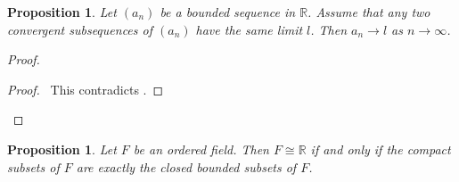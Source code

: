 \documentclass{article}
\let\qed\relax
\newtheorem{proposition}[axiom]{Proposition}
\theoremstyle{definition}
\begin{document}
\begin{proposition}
    Let $(a_n)$ be a bounded sequence in $\mathbb{R}$. Assume that any two convergent subsequences of $(a_n)$ have the same limit $l$.
    Then $a_n \rightarrow l$ as $n \rightarrow \infty$.
\end{proposition}

\begin{proof}
    \pf
    \qedstep
    \begin{proof}
        \pf\ This contradicts .
    \end{proof}
    \qed
\end{proof}

\begin{proposition}
    Let $F$ be an ordered field. Then $F \cong \mathbb{R}$ if and only if the compact subsets of $F$ are exactly the closed bounded subsets
    of $F$.
\end{proposition}
\end{document}
